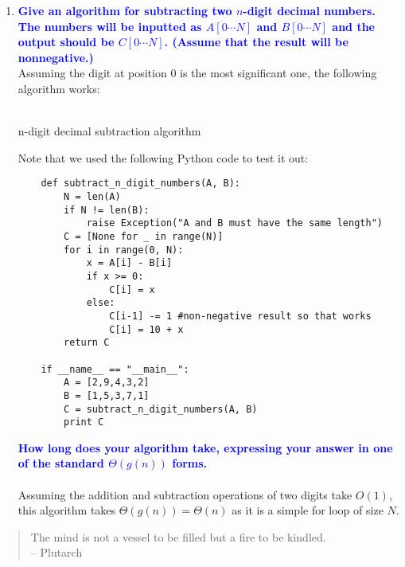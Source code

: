 \documentclass[11pt]{article}
\begin{document}
\begin{enumerate}
\item \textbf{\textcolor{blue}{Give an algorithm for subtracting two $n$-digit decimal numbers.
The numbers will be inputted as $A[0\cdots N]$ and $B[0\cdots N]$
and the output should be $C[0\cdots N]$.  (Assume that the result will
be nonnegative.)}}
    \\ Assuming the digit at position $0$ is the most significant one, the following algorithm works:
    \\\\
    \begin{algorithm}[H]
        \caption{n-digit decimal subtraction algorithm}
    \end{algorithm}
    Note that we used the following Python code to test it out:
    \begin{verbatim}
    def subtract_n_digit_numbers(A, B):
        N = len(A)
        if N != len(B):
            raise Exception("A and B must have the same length")
        C = [None for _ in range(N)]
        for i in range(0, N):
            x = A[i] - B[i]
            if x >= 0:
                C[i] = x
            else:
                C[i-1] -= 1 #non-negative result so that works
                C[i] = 10 + x
        return C    
    
    if __name__ == "__main__":
        A = [2,9,4,3,2]
        B = [1,5,3,7,1]
        C = subtract_n_digit_numbers(A, B)
        print C
    \end{verbatim}
    \newline

    \textbf{\textcolor{blue}{How long does your algorithm take, expressing
    your answer in one of the standard $\Theta(g(n))$ forms.}}
        \\\\Assuming the addition and subtraction operations of two digits take $O(1)$, this algorithm takes $\Theta(g(n))=\Theta(n)$ as it is a simple for loop of size $N$.
\end{enumerate}


\begin{quote}
The mind is not a vessel to be filled but a fire to be kindled.  \\ -- Plutarch
\end{quote}
\end{document}
